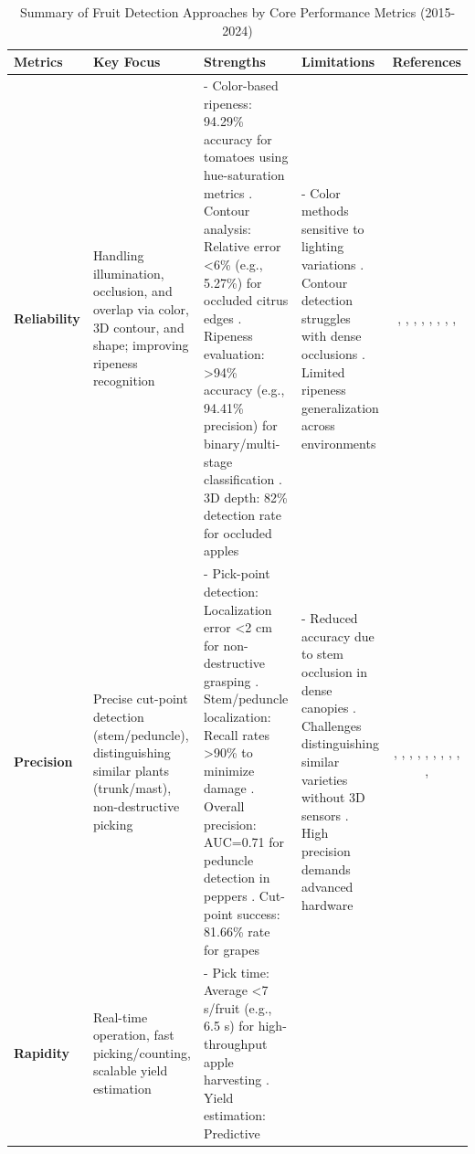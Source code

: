 \documentclass{ieeeaccess}
\begin{document}
\iffalse
\begin{table}[htbp]
\centering
\small
\caption{Summary of Fruit Detection Approaches by Core Performance Metrics (2015-2024)}
\label{tab:performance-metrics}
\renewcommand{\arraystretch}{1.2}
\begin{tabularx}{\textwidth}{l X X X c}
\toprule
\textbf{Metrics} & \textbf{Key Focus} & \textbf{Strengths} & \textbf{Limitations} & \textbf{References} \\ \midrule
\textbf{Reliability} & Handling illumination, occlusion, and overlap via color, 3D contour, and shape; improving ripeness recognition & - Color-based ripeness: 94.29\% accuracy for tomatoes using hue-saturation metrics \cite{goel2015fuzzy}. Contour analysis: Relative error <6\% (e.g., 5.27\%) for occluded citrus edges \cite{lu2015detecting}. Ripeness evaluation: >94\% accuracy (e.g., 94.41\% precision) for binary/multi-stage classification \cite{liu2019mature}. 3D depth: 82\% detection rate for occluded apples \cite{nguyen2016detection} & - Color methods sensitive to lighting variations \cite{zhao2016detecting}. Contour detection struggles with dense occlusions \cite{lu2015detecting}. Limited ripeness generalization across environments \cite{goel2015fuzzy} & \cite{nguyen2016detection}, \cite{lu2015detecting}, \cite{mendes2016vine}, \cite{goel2015fuzzy}, \cite{zhao2016detecting}, \cite{pourdarbani2020automatic}, \cite{zhang2018deep}, \cite{longsheng2015kiwifruit}, \cite{liu2019mature} \\ \midrule
\textbf{Precision} & Precise cut-point detection (stem/peduncle), distinguishing similar plants (trunk/mast), non-destructive picking & - Pick-point detection: Localization error <2 cm for non-destructive grasping \cite{lehnert2016sweet}. Stem/peduncle localization: Recall rates >90\% to minimize damage \cite{mendes2016vine}. Overall precision: AUC=0.71 for peduncle detection in peppers \cite{sa2017peduncle}. Cut-point success: 81.66\% rate for grapes \cite{luo2018vision} & - Reduced accuracy due to stem occlusion in dense canopies \cite{sa2017peduncle}. Challenges distinguishing similar varieties without 3D sensors \cite{lin2020fruit}. High precision demands advanced hardware \cite{kusumam20173d} & \cite{kusumam20173d}, \cite{lehnert2016sweet}, \cite{bac2017performance}, \cite{mendes2016vine}, \cite{sa2017peduncle}, \cite{luo2018vision}, \cite{perez2018pattern}, \cite{liu2019mature}, \cite{pourdarbani2020automatic}, \cite{lin2020fruit}, \cite{CHEN2024111082} \\ \midrule
\textbf{Rapidity} & Real-time operation, fast picking/counting, scalable yield estimation & - Pick time: Average <7 s/fruit (e.g., 6.5 s) for high-throughput apple harvesting \cite{kang2020real}. Yield estimation: Predictive 

\end{tabularx}
\end{table}
\end{document}
